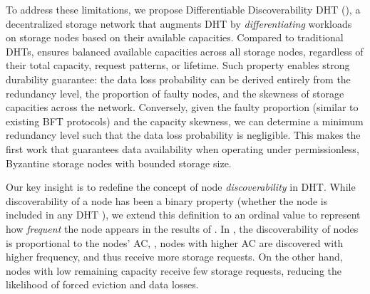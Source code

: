 
To address these limitations, we propose Differentiable Discoverability DHT (\dht), a decentralized storage network that augments DHT by \emph{differentiating} workloads on storage nodes based on their available capacities.
Compared to traditional DHTs, \dht ensures balanced available capacities across all storage nodes, regardless of their total capacity, request patterns, or lifetime.
Such property enables strong durability guarantee: the data loss probability can be derived entirely from the redundancy level, the proportion of faulty nodes, and the skewness of storage capacities across the network.
Conversely, given the faulty proportion (similar to existing BFT protocols) and the capacity skewness, we can determine a minimum redundancy level such that the data loss probability is negligible.
This makes \dht the first work that guarantees data availability when operating under permissionless, Byzantine storage nodes with bounded storage size.

Our key insight is to redefine the concept of node \emph{discoverability} in DHT.
While discoverability of a node has been a binary property (whether the node is included in any DHT \ffind), we extend this definition to an ordinal value to represent how \emph{frequent} the node appears in the results of \ffind.
In \dht, the discoverability of nodes is proportional to the nodes' AC, \ie, nodes with higher AC are discovered with higher frequency, and thus receive more storage requests.
On the other hand, nodes with low remaining capacity receive few storage requests, reducing the likelihood of forced eviction and data losses.

